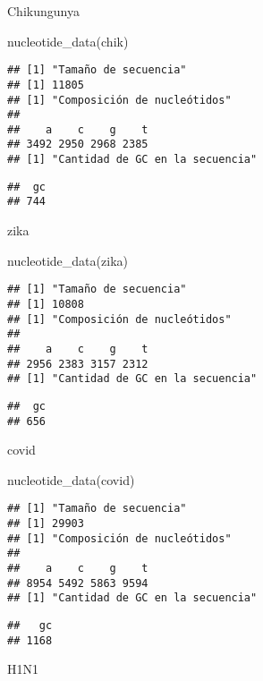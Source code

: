 \documentclass[
]{article}
\newenvironment{Shaded}{\begin{snugshade}}{\end{snugshade}}
\newcommand{\FunctionTok}[1]{\textcolor[rgb]{0.00,0.00,0.00}{#1}}
\newcommand{\NormalTok}[1]{#1}
\begin{document}
Chikungunya

\begin{Shaded}
\begin{Highlighting}[]
\FunctionTok{nucleotide\_data}\NormalTok{(chik)}
\end{Highlighting}
\end{Shaded}

\begin{verbatim}
## [1] "Tamaño de secuencia"
## [1] 11805
## [1] "Composición de nucleótidos"
## 
##    a    c    g    t 
## 3492 2950 2968 2385 
## [1] "Cantidad de GC en la secuencia"
\end{verbatim}

\begin{verbatim}
##  gc 
## 744
\end{verbatim}

zika

\begin{Shaded}
\begin{Highlighting}[]
\FunctionTok{nucleotide\_data}\NormalTok{(zika)}
\end{Highlighting}
\end{Shaded}

\begin{verbatim}
## [1] "Tamaño de secuencia"
## [1] 10808
## [1] "Composición de nucleótidos"
## 
##    a    c    g    t 
## 2956 2383 3157 2312 
## [1] "Cantidad de GC en la secuencia"
\end{verbatim}

\begin{verbatim}
##  gc 
## 656
\end{verbatim}

covid

\begin{Shaded}
\begin{Highlighting}[]
\FunctionTok{nucleotide\_data}\NormalTok{(covid)}
\end{Highlighting}
\end{Shaded}

\begin{verbatim}
## [1] "Tamaño de secuencia"
## [1] 29903
## [1] "Composición de nucleótidos"
## 
##    a    c    g    t 
## 8954 5492 5863 9594 
## [1] "Cantidad de GC en la secuencia"
\end{verbatim}

\begin{verbatim}
##   gc 
## 1168
\end{verbatim}

H1N1
\end{document}
